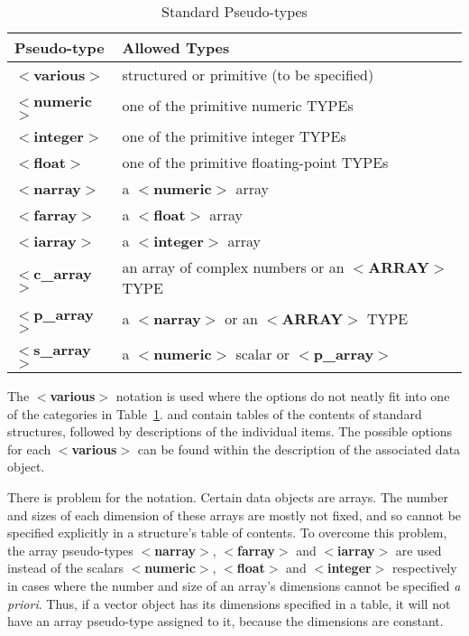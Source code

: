 \documentclass[twoside,11pt,nolof,noabs]{starlink}
\begin{document}
\begin{table}
\centering
\caption{Standard Pseudo-types}
\label{ta:pseudotypes}
\begin{tabular}[t]{|l|l|}
\hline
Pseudo-type & Allowed Types \\ \hline
$<$\textbf{various}$>$  & structured or primitive (to be specified) \\
$<$\textbf{numeric}$>$  & one of the primitive numeric TYPEs \\
$<$\textbf{integer}$>$  & one of the primitive integer TYPEs \\
$<$\textbf{float}$>$    & one of the primitive floating-point TYPEs \\
$<$\textbf{narray}$>$   & a $<$\textbf{numeric}$>$ array \\
$<$\textbf{farray}$>$   & a $<$\textbf{float}$>$ array \\
$<$\textbf{iarray}$>$   & a $<$\textbf{integer}$>$ array \\
$<$\textbf{c\_array}$>$ & an array of complex numbers or an $<$\textbf{ARRAY}$>$ TYPE \\
$<$\textbf{p\_array}$>$ & a $<$\textbf{narray}$>$ or an $<$\textbf{ARRAY}$>$ TYPE \\
$<$\textbf{s\_array}$>$ & a $<$\textbf{numeric}$>$ scalar or $<$\textbf{p\_array}$>$ \\ \hline
\end{tabular}
\end{table}

The $<$\textbf{various}$>$ notation is used where the options do not
neatly fit into one of the categories in Table~\ref{ta:pseudotypes}.
 and \latex{\ref{se:ndf}} contain tables of the
contents of standard structures, followed by descriptions of the
individual items. The possible options for each $<$\textbf{various}$>$
can be found within the description of the associated data object.

There is problem for the notation.
Certain data objects are arrays. The number and sizes of each dimension
of these arrays are mostly not fixed, and so cannot be specified explicitly
in a structure's table of contents.
To overcome this problem, the array pseudo-types
$<$\textbf{narray}$>$, $<$\textbf{farray}$>$
and $<$\textbf{iarray}$>$ are used instead of the scalars
$<$\textbf{numeric}$>$, $<$\textbf{float}$>$ and $<$\textbf{integer}$>$ respectively
in cases where the number and size of an array's dimensions cannot be
specified \textit{a priori}.
Thus, if a vector object has its dimensions specified in a table,
it will not have an array pseudo-type assigned to it, because the
dimensions are constant.
\end{document}
